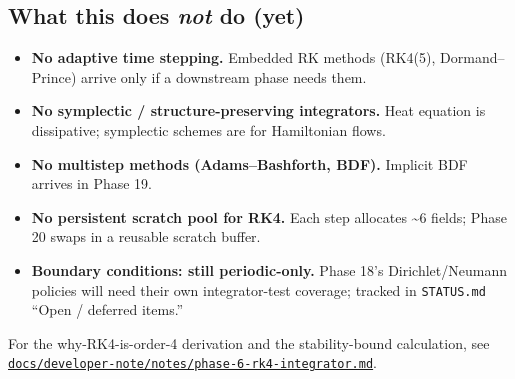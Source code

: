 \subsection{\texorpdfstring{What this does \emph{not} do
(yet)}{What this does not do (yet)}}\label{what-this-does-not-do-yet}

\begin{itemize}
\tightlist
\item
  \textbf{No adaptive time stepping.} Embedded RK methods (RK4(5),
  Dormand--Prince) arrive only if a downstream phase needs them.
\item
  \textbf{No symplectic / structure-preserving integrators.} Heat
  equation is dissipative; symplectic schemes are for Hamiltonian flows.
\item
  \textbf{No multistep methods (Adams--Bashforth, BDF).} Implicit BDF
  arrives in Phase 19.
\item
  \textbf{No persistent scratch pool for RK4.} Each step allocates
  \textasciitilde6 fields; Phase 20 swaps in a reusable scratch buffer.
\item
  \textbf{Boundary conditions: still periodic-only.} Phase 18's
  Dirichlet/Neumann policies will need their own integrator-test
  coverage; tracked in \passthrough{\lstinline!STATUS.md!} ``Open /
  deferred items.''
\end{itemize}

For the why-RK4-is-order-4 derivation and the stability-bound
calculation, see
\href{../../developer-note/notes/phase-6-rk4-integrator.md}{\passthrough{\lstinline!docs/developer-note/notes/phase-6-rk4-integrator.md!}}.
